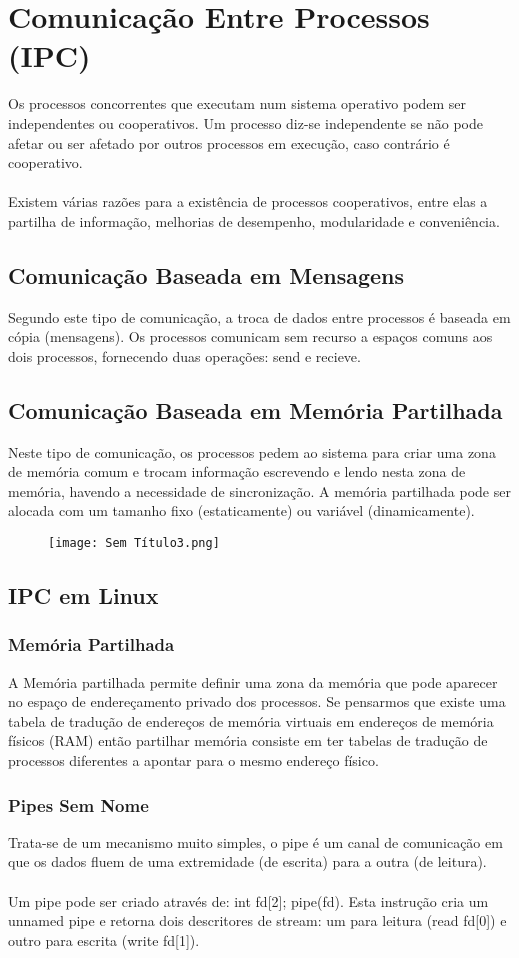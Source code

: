 \documentclass[10pt,a4paper]{report}
\begin{document}
\section{Comunicação Entre Processos (IPC)}
Os processos concorrentes que executam num sistema operativo podem ser independentes ou cooperativos. Um processo diz-se independente se não pode afetar ou ser afetado por outros processos em execução, caso contrário é cooperativo.\\
\\
Existem várias razões para a existência de processos cooperativos, entre elas a partilha de informação, melhorias de desempenho, modularidade e conveniência.
\subsection{Comunicação Baseada em Mensagens}
Segundo este tipo de comunicação, a troca de dados entre processos é baseada em cópia (mensagens). Os processos comunicam sem recurso a espaços comuns aos dois processos, fornecendo duas operações: send e recieve.
\subsection{Comunicação Baseada em Memória Partilhada}
Neste tipo de comunicação, os processos pedem ao sistema para criar uma zona de memória comum e trocam informação escrevendo e lendo nesta zona de memória, havendo a necessidade de sincronização. A memória partilhada pode ser alocada com um tamanho fixo (estaticamente) ou variável (dinamicamente).
\begin{figure}[H]
\centering
\texttt{[image: Sem Título3.png]}
\end{figure}
\subsection{IPC em Linux}
\subsubsection{Memória Partilhada}
A Memória partilhada permite definir uma zona da memória que pode aparecer no espaço de endereçamento privado dos processos. Se pensarmos que existe uma tabela de tradução de endereços de memória virtuais em endereços de memória físicos (RAM) então partilhar memória consiste em ter tabelas de tradução de processos diferentes a apontar para o mesmo endereço físico.
\subsubsection{Pipes Sem Nome}
Trata-se de um mecanismo muito simples, o pipe é um canal de comunicação em que os dados fluem de uma extremidade (de escrita) para a outra (de leitura).\\
\\
Um pipe pode ser criado através de: int fd[2]; pipe(fd).
Esta instrução cria um unnamed pipe e retorna dois descritores de stream: um para leitura (read fd[0]) e outro para escrita (write fd[1]).
\end{document}
